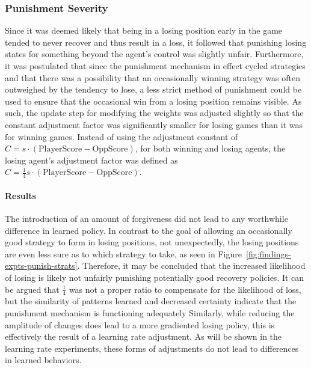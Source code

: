 
\subsubsection*{Punishment Severity}
\label{sec:findings-expts-punishments}

Since it was deemed likely that being in a losing position early in the game
tended to never recover and thus result in a loss,
it followed that punishing losing states for something beyond the agent's
control was slightly unfair.
%
Furthermore,
it was postulated that since the punishment mechanism in effect cycled
strategies
and that there was a possibility that an occasionally winning strategy was often
outweighed by the tendency to lose,
a less strict method of punishment could be used to ensure that the occasional
win from a losing position remains visible.
%
As such,
the update step for modifying the weights was adjusted slightly
so that the constant adjustment factor was significantly smaller for losing
games than it was for winning games.
%
Instead of using the adjustment constant of
$C = s \cdot (\text{PlayerScore} - \text{OppScore})$,
for both winning and losing agents,
the losing agent's adjustment factor was defined as
$C = \frac{1}{4} s \cdot (\text{PlayerScore} - \text{OppScore})$.

\paragraph*{Results}

The introduction of an amount of forgiveness did not lead to any worthwhile
difference in learned policy.
%
In contrast to the goal of allowing an occasionally good strategy to form
in losing positions,
not unexpectedly,
the losing positions are even less sure as to which strategy to take,
as seen in Figure~\ref{fig:findings-expts-punish-strats}.
%
Therefore,
it may be concluded that the increased likelihood of losing is 
likely not unfairly punishing potentially good recovery policies.
%
It can be argued that $\frac{1}{4}$ was not a proper ratio
to compensate for the likelihood of loss,
but the similarity of patterns learned and decreased certainty
indicate that the punishment mechanism is functioning adequately
%
Similarly,
while reducing the amplitude of changes
does lead to a more gradiented losing policy,
this is effectively the result of a learning rate adjustment.
%
As will be shown in the learning rate experiments,
these forms of adjustments do not lead to differences in learned behaviors.



